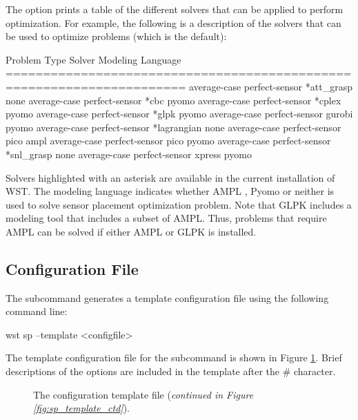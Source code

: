 The  option prints a table of the different solvers that can
be applied to perform optimization. For example, the following is a description
of the solvers that can be used to optimize  problems (which is the default):

\begin{unknownListing}
Problem Type                  Solver        Modeling Language  
======================================================================
average-case perfect-sensor   *att_grasp     none               
average-case perfect-sensor   *cbc           pyomo              
average-case perfect-sensor   *cplex         pyomo              
average-case perfect-sensor   *glpk          pyomo              
average-case perfect-sensor    gurobi        pyomo              
average-case perfect-sensor   *lagrangian    none               
average-case perfect-sensor    pico          ampl               
average-case perfect-sensor    pico          pyomo              
average-case perfect-sensor   *snl_grasp     none               
average-case perfect-sensor    xpress        pyomo     
\end{unknownListing}

Solvers highlighted with an asterisk are available in the current
installation of WST. The modeling language indicates whether AMPL
\citep{AMPL}, Pyomo \citep{PYOMO} or neither is used to solve sensor
placement optimization problem. Note that GLPK includes a modeling
tool that includes a subset of AMPL. Thus, problems that require
AMPL can be solved if either AMPL or GLPK is installed.


\subsection{Configuration File}

The  subcommand generates a template configuration file using the following command line:
\begin{unknownListing}
wst sp --template <configfile>
\end{unknownListing}

The template configuration file for the  subcommand is shown in Figure \ref{fig:sp_template}.  
Brief descriptions of the options are included in the template after the \# character.  

\begin{figure}[h!]
	\caption[The  configuration template file]{The  configuration template file (\textit{continued in Figure \ref{fig:sp_template_ctd}}).}
	\label{fig:sp_template}
\end{figure}

